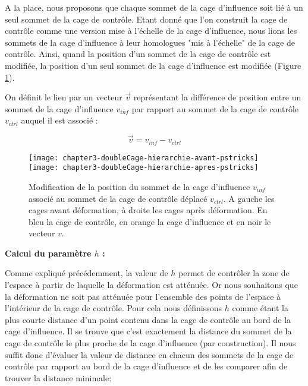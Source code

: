 A la place, nous proposons que chaque sommet de la cage d'influence soit lié à
un seul sommet de la cage de contrôle. Etant donné que l'on construit la cage
de contrôle comme une version mise à l'échelle de la cage d'influence, nous
lions les sommets de la cage d'influence à leur homologues "mis à l'échelle"
de la cage de contrôle. Ainsi, quand la position d'un sommet de la cage de
contrôle est modifiée, la position d'un seul sommet de la cage d'influence est
modifiée (Figure \ref{MELHie}).

On définit le lien par un vecteur $\overrightarrow{v}$ représentant la
différence de position entre un sommet de la cage d'influence $v_{inf}$ par
rapport au sommet de la cage de contrôle $v_{ctrl}$ auquel il est associé :

\begin{displaymath}
  \overrightarrow{v} = v_{inf}-v_{ctrl}
\end{displaymath}

\begin{figure}[!ht]
  \texttt{[image: chapter3-doubleCage-hierarchie-avant-pstricks]}
  \texttt{[image: chapter3-doubleCage-hierarchie-apres-pstricks]}

  \caption[Association des cages de contrôle et d'influence] {Modification de
la position du sommet de la cage d'influence $v_{inf}$ associé au sommet de la
cage de contrôle déplacé $v_{ctrl}$. A gauche les cages avant déformation, à
droite les cages après déformation. En bleu la cage de contrôle, en orange la
cage d'influence et en noir le vecteur $v$.}

  \label{MELHie}
\end{figure}

\textbf{Calcul du paramètre $h$ :}

Comme expliqué précédemment, la valeur de $h$ permet de contrôler la zone de
l'espace à partir de laquelle la déformation est atténuée. Or nous souhaitons
que la déformation ne soit pas atténuée pour l'ensemble des points de l'espace
à l'intérieur de la cage de contrôle. Pour cela nous définissons $h$ comme
étant la plus courte distance d'un point contenu dans la cage de contrôle au
bord de la cage d'influence. Il se trouve que c'est exactement la distance du
sommet de la cage de contrôle le plus proche de la cage d'influence (par
construction). Il nous suffit donc d'évaluer la valeur de distance en chacun
des sommets de la cage de contrôle par rapport au bord de la cage d'influence
et de les comparer afin de trouver la distance minimale:


